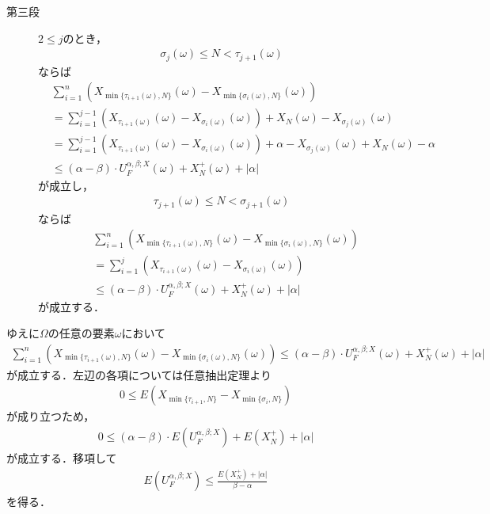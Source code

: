 \begin{sketch}
\begin{description}
 			\item[第三段]
 				$2 \leq j$のとき，
 				\begin{align}
 					\sigma_j(\omega) \leq N < \tau_{j+1}(\omega)
 				\end{align}
 				ならば
 				\begin{align}
 					&\sum_{i=1}^n \left( X_{\min{}{\{\tau_{i+1}(\omega),N\}}}(\omega) - X_{\min{}{\{\sigma_i(\omega),N\}}}(\omega) \right) \\
 					&= \sum_{i=1}^{j-1} \left( X_{\tau_{i+1}(\omega)}(\omega) - X_{\sigma_i(\omega)}(\omega) \right)
 					+ X_N(\omega) - X_{\sigma_j(\omega)}(\omega) \\
 					&= \sum_{i=1}^{j-1} \left( X_{\tau_{i+1}(\omega)}(\omega) - X_{\sigma_i(\omega)}(\omega) \right)
 					+ \alpha - X_{\sigma_j(\omega)}(\omega) + X_N(\omega) - \alpha \\
 					&\leq (\alpha-\beta) \cdot U_F^{\alpha,\beta;X}(\omega) + X_N^+(\omega) + |\alpha|
 				\end{align}
 				が成立し， 	
 				\begin{align}
 					\tau_{j+1}(\omega) \leq N < \sigma_{j+1}(\omega)
 				\end{align}
 				ならば
 				\begin{align}
 					&\sum_{i=1}^n \left( X_{\min{}{\{\tau_{i+1}(\omega),N\}}}(\omega) - X_{\min{}{\{\sigma_i(\omega),N\}}}(\omega) \right) \\
 					&= \sum_{i=1}^{j} \left( X_{\tau_{i+1}(\omega)}(\omega) - X_{\sigma_i(\omega)}(\omega) \right) \\
 					&\leq (\alpha-\beta) \cdot U_F^{\alpha,\beta;X}(\omega) + X_N^+(\omega) + |\alpha|
 				\end{align}
 				が成立する．
 		\end{description}
 			
 		ゆえに$\Omega$の任意の要素$\omega$において
 		\begin{align}
 			\sum_{i=1}^n \left( X_{\min{}{\{\tau_{i+1}(\omega),N\}}}(\omega) - X_{\min{}{\{\sigma_i(\omega),N\}}}(\omega) \right)
 			\leq (\alpha-\beta) \cdot U_F^{\alpha,\beta;X}(\omega) + X_N^+(\omega) + |\alpha|
 		\end{align}
 		が成立する．左辺の各項については任意抽出定理より
 		\begin{align}
 			0 \leq E\left(X_{\min{}{\{\tau_{i+1},N\}}} - X_{\min{}{\{\sigma_i,N\}}}\right)
 		\end{align}
 		が成り立つため，
 		\begin{align}
 			0 \leq (\alpha-\beta) \cdot E\left(U_F^{\alpha,\beta;X}\right) + E(X_N^+) + |\alpha|
 		\end{align}
	 	が成立する．移項して
	 	\begin{align}
	 		E\left( U_F^{\alpha,\beta;X} \right) \leq \frac{E(X_N^+) + |\alpha|}{\beta - \alpha}
	 	\end{align}
	 	を得る．
	 	\QED
	 \end{sketch}
 	
